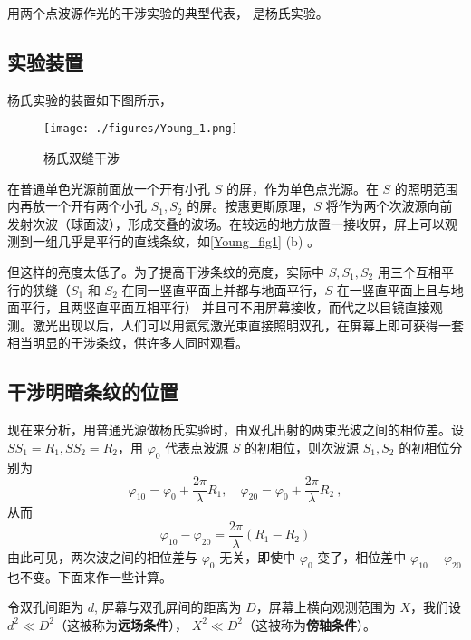 

用两个点波源作光的干涉实验的典型代表， 是杨氏实验。
\subsection{实验装置}
杨氏实验的装置如下图所示，
\begin{figure}[ht]
\centering
\texttt{[image: ./figures/Young\_1.png]}
\caption{杨氏双缝干涉} \label{Young_fig1}
\end{figure}
在普通单色光源前面放一个开有小孔 $S$ 的屏，作为单色点光源。在 $S $ 的照明范围内再放一个开有两个小孔 $S_1,S_2$ 的屏。按惠更斯原理，$S$ 将作为两个次波源向前发射次波（球面波），形成交叠的波场。在较远的地方放置一接收屏，屏上可以观测到一组几乎是平行的直线条纹，如\autoref{Young_fig1} (b) 。

但这样的亮度太低了。为了提高干涉条纹的亮度，实际中 $S,S_1,S_2$ 用三个互相平行的狭缝（$S_1$ 和 $S_2$ 在同一竖直平面上并都与地面平行，$S$ 在一竖直平面上且与地面平行，且两竖直平面互相平行）
并且可不用屏幕接收，而代之以目镜直接观测。激光出现以后，人们可以用氦氖激光束直接照明双孔，在屏幕上即可获得一套相当明显的干涉条纹，供许多人同时观看。

\subsection{干涉明暗条纹的位置}
现在来分析，用普通光源做杨氏实验时，由双孔出射的两束光波之间的相位差。设 $SS_1=R_1,SS_2=R_2$，用 $\varphi_0$ 代表点波源 $S$ 的初相位，则次波源 $S_1,S_2$ 的初相位分别为
\begin{equation}
\varphi_{10}=\varphi_{0}+\frac{2 \pi}{\lambda} R_{1}, \quad \varphi_{20}=\varphi_{0}+\frac{2 \pi}{\lambda} R_{2}~,
\end{equation}
从而
\begin{equation}
\varphi_{10}-\varphi_{20}=\frac{2 \pi}{\lambda}\left(R_{1}-R_{2}\right)
\end{equation}
由此可见，两次波之间的相位差与 $\varphi_0$ 无关，即使中 $\varphi_0$ 变了，相位差中 $\varphi_{10}-\varphi_{20}$ 也不变。下面来作一些计算。

令双孔间距为 $d$, 屏幕与双孔屏间的距离为 $D$，屏幕上横向观测范围为 $X$，我们设 $d^{2} \ll D^{2}$（这被称为\textbf{远场条件}）， $X^{2} \ll D^{2}$（这被称为\textbf{傍轴条件}）。

